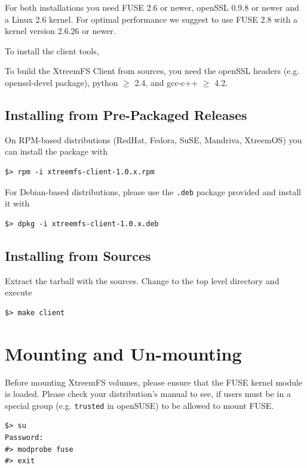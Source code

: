 \documentclass[a4paper,10pt]{book}
\begin{document}
For both installations you need FUSE 2.6 or newer, openSSL 0.9.8 or newer and a Linux 2.6 kernel. For optimal performance we suggest to use FUSE 2.8 with a kernel version 2.6.26 or newer.

To install the client tools, 

To build the XtreemFS Client from sources, you need the openSSL headers (e.g. openssl-devel package), python $\geq$ 2.4, and gcc-c++ $\geq$ 4.2.

\subsection{Installing from Pre-Packaged Releases}

On RPM-based distributions (RedHat, Fedora, SuSE, Mandriva, XtreemOS) you can install the package with


\begin{verbatim}
$> rpm -i xtreemfs-client-1.0.x.rpm
\end{verbatim}


For Debian-based distributions, please use the \texttt{.deb} package provided and install it with


\begin{verbatim}
$> dpkg -i xtreemfs-client-1.0.x.deb
\end{verbatim}



\subsection{Installing from Sources}

Extract the tarball with the sources. Change to the top level directory and execute


\begin{verbatim}
$> make client
\end{verbatim}


\section{Mounting and Un-mounting}
\label{sec:mount_vol}

Before mounting XtreemFS volumes, please ensure that the FUSE kernel module is loaded. Please check your distribution's manual to see, if users must be in a special group (e.g. \texttt{trusted} in openSUSE) to be allowed to mount FUSE.


\begin{verbatim}
$> su
Password:
#> modprobe fuse
#> exit
\end{verbatim}
\end{document}
